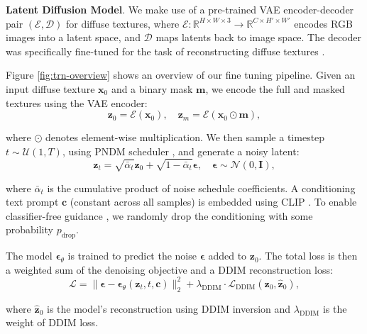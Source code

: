 \documentclass[11pt,twocolumn]{article}
\begin{document}
\textbf{Latent Diffusion Model}. We make use of a pre-trained VAE \cite{vae} encoder-decoder pair $(\mathcal{E}, \mathcal{D})$ 
for diffuse textures, where $\mathcal{E}: \mathbb{R}^{H \times W \times 3} \rightarrow \mathbb{R}^{C \times H' \times W'}$ 
encodes RGB images into a latent space, and $\mathcal{D}$ maps latents back to image space. 
The decoder was specifically fine-tuned for the task of reconstructing diffuse textures 
\cite{dresscode}.

Figure \ref{fig:trn-overview} shows an overview of our fine tuning pipeline. Given an input diffuse texture $\mathbf{x}_0$ and a binary mask $\mathbf{m}$, we encode the full and masked textures using the VAE encoder:
\vspace{0.0em}
\begin{equation}
\mathbf{z}_0 = \mathcal{E}(\mathbf{x}_0), \quad \mathbf{z}_m = \mathcal{E}(\mathbf{x}_0 \odot \mathbf{m}),
\end{equation}

where $\odot$ denotes element-wise multiplication. We then sample a timestep $t \sim \mathcal{U}(1, T)$, using PNDM scheduler \cite{pndm}, and generate a noisy latent:
\vspace{0.0em}
\begin{equation}
\mathbf{z}_t = \sqrt{\bar{\alpha}_t} \mathbf{z}_0 + \sqrt{1 - \bar{\alpha}_t} \boldsymbol{\epsilon}, \quad \boldsymbol{\epsilon} \sim \mathcal{N}(0, \mathbf{I}),
\end{equation}

where $\bar{\alpha}_t$ is the cumulative product of noise schedule coefficients. A conditioning text prompt $\mathbf{c}$ (constant across all samples) is embedded using CLIP \cite{clip}. To enable classifier-free guidance \cite{cfg}, we randomly drop the conditioning with some probability $p_{\text{drop}}$.

The model $\boldsymbol{\epsilon}_\theta$ is trained to predict the noise $\boldsymbol{\epsilon}$ added to $\mathbf{z}_0$. The total loss is then a weighted sum of the denoising objective and a DDIM reconstruction loss:
\vspace{0.0em}
\begin{equation}
\mathcal{L} = \|\boldsymbol{\epsilon} - \boldsymbol{\epsilon}_\theta(\mathbf{z}_t, t, \mathbf{c})\|_2^2 + \lambda_{\text{DDIM}} \cdot \mathcal{L}_{\text{DDIM}}(\mathbf{z}_0, \hat{\mathbf{z}}_0),
\end{equation}

where $\hat{\mathbf{z}}_0$ is the model's reconstruction using DDIM inversion \cite{ddim} and $\lambda_{\text{DDIM}}$ is the weight of DDIM loss.
\end{document}

